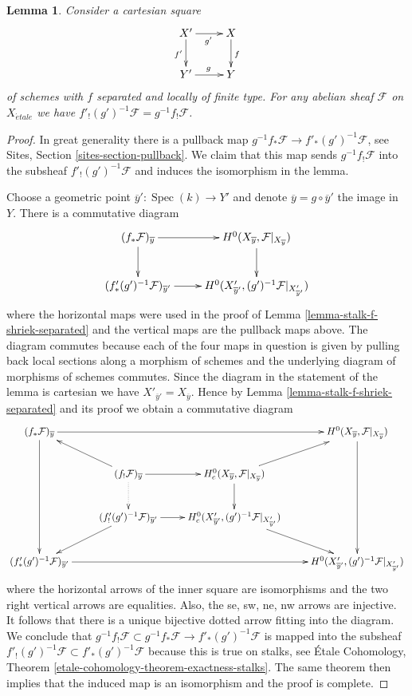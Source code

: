 \documentclass{stacks-project}
\theoremstyle{plain}
\newtheorem{lemma}[subsection]{Lemma}
\theoremstyle{definition}
\theoremstyle{remark}
\numberwithin{equation}{subsection}
\def\Spec{\mathop{\mathrm{Spec}}}
\def\etale{{\acute{e}tale}}
\begin{document}
\begin{lemma}
\label{lemma-base-change-f-shriek-separated}
Consider a cartesian square
$$
\xymatrix{
X' \ar[r]_{g'} \ar[d]_{f'} & X \ar[d]^f \\
Y' \ar[r]^g & Y
}
$$
of schemes with $f$ separated and locally of finite type.
For any abelian sheaf $\mathcal{F}$ on $X_\etale$ we have
$f'_!(g')^{-1}\mathcal{F} = g^{-1}f_!\mathcal{F}$.
\end{lemma}

\begin{proof}
In great generality there is a pullback map
$g^{-1}f_*\mathcal{F} \to f'_*(g')^{-1}\mathcal{F}$, see
Sites, Section \ref{sites-section-pullback}.
We claim that this map sends $g^{-1}f_!\mathcal{F}$
into the subsheaf $f'_!(g')^{-1}\mathcal{F}$
and induces the isomorphism in the lemma.

\medskip\noindent
Choose a geometric point $\overline{y}': \Spec(k) \to Y'$ and denote
$\overline{y} = g \circ \overline{y}'$ the image in $Y$. There is a
commutative diagram
$$
\xymatrix{
(f_*\mathcal{F})_{\overline{y}} \ar[r] \ar[d] &
H^0(X_{\overline{y}}, \mathcal{F}|_{X_{\overline{y}}}) \ar[d] \\
(f'_*(g')^{-1}\mathcal{F})_{\overline{y}'} \ar[r] &
H^0(X'_{\overline{y}'}, (g')^{-1}\mathcal{F}|_{X'_{\overline{y}'}})
}
$$
where the horizontal maps were used in the proof of
Lemma \ref{lemma-stalk-f-shriek-separated}
and the vertical maps are the pullback maps above.
The diagram commutes because each of the four maps
in question is given by pulling back local sections along
a morphism of schemes and the underlying diagram of morphisms
of schemes commutes. Since the diagram in the statement of the lemma
is cartesian we have $X'_{\overline{y}'} = X_{\overline{y}}$.
Hence by Lemma \ref{lemma-stalk-f-shriek-separated}
and its proof we obtain a commutative diagram
$$
\xymatrix{
(f_*\mathcal{F})_{\overline{y}} \ar[rrr] \ar[ddd] & & &
H^0(X_{\overline{y}}, \mathcal{F}|_{X_{\overline{y}}}) \ar[ddd] \\
& (f_!\mathcal{F})_{\overline{y}} \ar[r] \ar@{..>}[d] \ar[lu] &
H^0_c(X_{\overline{y}}, \mathcal{F}|_{X_{\overline{y}}}) \ar[d] \ar[ru] \\
& (f'_!(g')^{-1}\mathcal{F})_{\overline{y}'} \ar[r] \ar[ld] &
H^0_c(X'_{\overline{y}'}, (g')^{-1}\mathcal{F}|_{X'_{\overline{y}'}}) \ar[rd]\\
(f'_*(g')^{-1}\mathcal{F})_{\overline{y}'} \ar[rrr] & & &
H^0(X'_{\overline{y}'}, (g')^{-1}\mathcal{F}|_{X'_{\overline{y}'}})
}
$$
where the horizontal arrows of the inner square are isomorphisms
and the two right vertical arrows are equalities. Also, the
se, sw, ne, nw arrows are injective. It follows that there is a unique
bijective dotted arrow fitting into the diagram. We conclude that
$g^{-1}f_!\mathcal{F} \subset g^{-1}f_*\mathcal{F} \to f'_*(g')^{-1}\mathcal{F}$
is mapped into the subsheaf
$f'_!(g')^{-1}\mathcal{F} \subset f'_*(g')^{-1}\mathcal{F}$
because this is true on stalks, see
\'Etale Cohomology, Theorem \ref{etale-cohomology-theorem-exactness-stalks}.
The same theorem then implies that the induced map is an isomorphism
and the proof is complete.
\end{proof}
\end{document}
